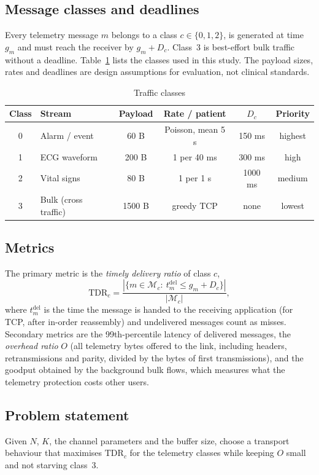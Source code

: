 \documentclass[10pt,twocolumn,letterpaper]{article}
\newcommand{\TDR}{\mathrm{TDR}}
\begin{document}
\subsection{Message classes and deadlines}
Every telemetry message $m$ belongs to a class $c\in\{0,1,2\}$, is generated at time $g_m$ and must reach the receiver by $g_m + D_c$. Class~3 is best-effort bulk traffic without a deadline. Table~\ref{tab:classes} lists the classes used in this study. The payload sizes, rates and deadlines are design assumptions for evaluation, not clinical standards.

\begin{table}[t]
\centering
\caption{Traffic classes}
\label{tab:classes}
\footnotesize
\setlength{\tabcolsep}{3pt}
\begin{tabular}{@{}clcccc@{}}
\toprule
Class & Stream & Payload & Rate / patient & $D_c$ & Priority\\
\midrule
0 & Alarm / event & 60 B & Poisson, mean 5 s & 150 ms & highest\\
1 & ECG waveform & 200 B & 1 per 40 ms & 300 ms & high\\
2 & Vital signs & 80 B & 1 per 1 s & 1000 ms & medium\\
3 & Bulk (cross traffic) & 1500 B & greedy TCP & none & lowest\\
\bottomrule
\end{tabular}
\end{table}

\subsection{Metrics}
The primary metric is the \emph{timely delivery ratio} of class $c$,
\begin{equation}
\TDR_c=\frac{\left|\{m\in\mathcal{M}_c:\ t^{\mathrm{del}}_m\le g_m+D_c\}\right|}{|\mathcal{M}_c|},
\end{equation}
where $t^{\mathrm{del}}_m$ is the time the message is handed to the receiving application (for TCP, after in-order reassembly) and undelivered messages count as misses. Secondary metrics are the 99th-percentile latency of delivered messages, the \emph{overhead ratio} $O$ (all telemetry bytes offered to the link, including headers, retransmissions and parity, divided by the bytes of first transmissions), and the goodput obtained by the background bulk flows, which measures what the telemetry protection costs other users.

\subsection{Problem statement}
Given $N$, $K$, the channel parameters and the buffer size, choose a transport behaviour that maximises $\TDR_c$ for the telemetry classes while keeping $O$ small and not starving class~3.
\end{document}
